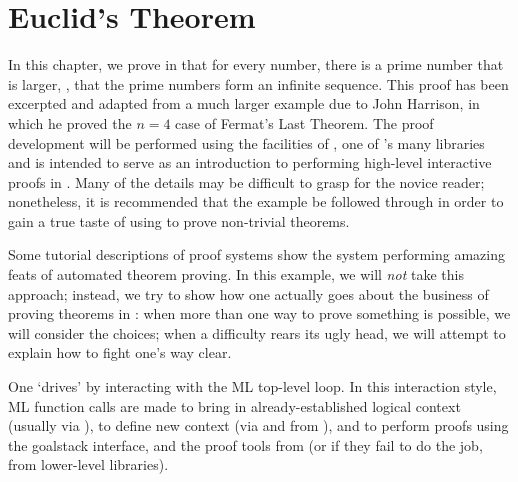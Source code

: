 
\chapter{Euclid's Theorem}
\label{chap:euclid}

\setcounter{sessioncount}{0}

In this chapter, we prove in \holn{} that for every number, there is a
prime number that is larger, \ie, that the prime numbers form an
infinite sequence. This proof has been excerpted and adapted from a
much larger example due to John Harrison, in which he proved the $n =
4$ case of Fermat's Last Theorem. The proof development will be
performed using the facilities of , one of \HOL's many
libraries and is intended to serve as an introduction to performing
high-level interactive proofs in \holn.  Many of the details may be
difficult to grasp for the novice reader; nonetheless, it is
recommended that the example be followed through in order to gain a
true taste of using \HOL{} to prove non-trivial theorems.

Some tutorial descriptions of proof systems show the system performing
amazing feats of automated theorem proving. In this example, we will
{\it not\/} take this approach; instead, we try to show how one
actually goes about the business of proving theorems in \holn{}: when
more than one way to prove something is possible, we will consider the
choices; when a difficulty rears its ugly head, we will attempt to
explain how to fight one's way clear.

One `drives' \holn{} by interacting with the ML top-level loop. In this
interaction style, ML function calls are made to bring in
already-established logical context (usually via ), to define
new context (via  and  from
), and to perform proofs using the goalstack interface, and
the proof tools from  (or if they fail to do the job, from
lower-level libraries).

